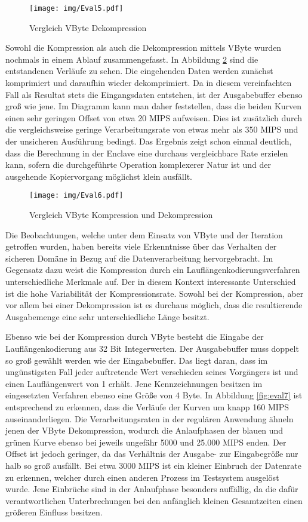 \begin{figure}[h]
	\texttt{[image: img/Eval5.pdf]}
	\centering
	\caption{Vergleich VByte Dekompression}
	\label{fig:eval5}
\end{figure}

Sowohl die Kompression als auch die Dekompression mittels VByte wurden nochmals in einem Ablauf zusammengefasst. In Abbildung \ref{fig:eval6} sind die entstandenen Verläufe zu sehen. Die eingehenden Daten werden zunächst komprimiert und daraufhin wieder dekomprimiert. Da in diesem vereinfachten Fall als Resultat stets die Eingangsdaten entstehen, ist der Ausgabebuffer ebenso groß wie jene. Im Diagramm kann man daher feststellen, dass die beiden Kurven einen sehr geringen Offset von etwa 20 MIPS aufweisen. Dies ist zusätzlich durch die vergleichsweise geringe Verarbeitungsrate von etwas mehr als 350 MIPS und der unsicheren Ausführung bedingt. Das Ergebnis zeigt schon einmal deutlich, dass die Berechnung in der Enclave eine durchaus vergleichbare Rate erzielen kann, sofern die durchgeführte Operation komplexerer Natur ist und der ausgehende Kopiervorgang möglichst klein ausfällt.

\begin{figure}[h]
	\texttt{[image: img/Eval6.pdf]}
	\centering
	\caption{Vergleich VByte Kompression und Dekompression}
	\label{fig:eval6}
\end{figure}

Die Beobachtungen, welche unter dem Einsatz von VByte und der Iteration getroffen wurden, haben bereits viele Erkenntnisse über das Verhalten der sicheren Domäne in Bezug auf die Datenverarbeitung hervorgebracht. Im Gegensatz dazu weist die Kompression durch ein Lauflängenkodierungsverfahren unterschiedliche Merkmale auf. Der in diesem Kontext interessante Unterschied ist die hohe Variabilität der Kompressionsrate. Sowohl bei der Kompression, aber vor allem bei einer Dekompression ist es durchaus möglich, dass die resultierende Ausgabemenge eine sehr unterschiedliche Länge besitzt.

Ebenso wie bei der Kompression durch VByte besteht die Eingabe der Lauflängenkodierung aus 32 Bit Integerwerten. Der Ausgabebuffer muss doppelt so groß gewählt werden wie der Eingabebuffer. Das liegt daran, dass im ungünstigsten Fall jeder auftretende Wert verschieden seines Vorgängers ist und einen Lauflängenwert von 1 erhält. Jene Kennzeichnungen besitzen im eingesetzten Verfahren ebenso eine Größe von 4 Byte. In Abbildung \ref{fig:eval7} ist entsprechend zu erkennen, dass die Verläufe der Kurven um knapp 160 MIPS auseinanderliegen. Die Verarbeitungsraten in der regulären Anwendung ähneln jenen der VByte Dekompression, wodurch die Anlaufphasen der blauen und grünen Kurve ebenso bei jeweils ungefähr 5000 und 25.000 MIPS enden. Der Offset ist jedoch geringer, da das Verhältnis der Ausgabe- zur Eingabegröße nur halb so groß ausfällt. Bei etwa 3000 MIPS ist ein kleiner Einbruch der Datenrate zu erkennen, welcher durch einen anderen Prozess im Testsystem ausgelöst wurde. Jene Einbrüche sind in der Anlaufphase besonders auffällig, da die dafür verantwortlichen Unterbrechungen bei den anfänglich kleinen Gesamtzeiten einen größeren Einfluss besitzen.

